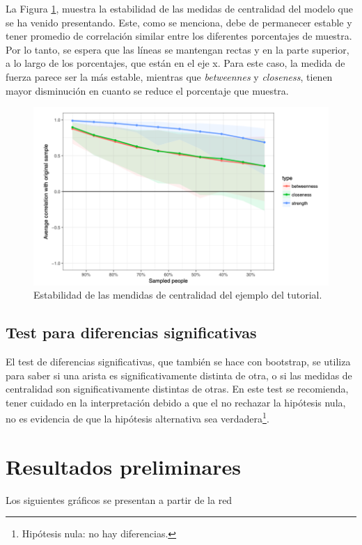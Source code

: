 \documentclass[11pt,spanish]{article}\usepackage[]{graphicx}\usepackage[]{color}
\begin{document}
La Figura \ref{fig:estabilidad_tutorial}, muestra la estabilidad de las medidas de centralidad del modelo que se ha venido presentando. Este, como se menciona, debe de permanecer estable y tener promedio de correlación similar entre los diferentes porcentajes de muestra. Por lo tanto, se espera que las líneas se mantengan rectas y en la parte superior, a lo largo de los porcentajes, que están en el eje x. Para este caso, la medida de fuerza parece ser la más estable, mientras que \emph{betweennes} y \emph{closeness}, tienen mayor disminución en cuanto se reduce el porcentaje que muestra. 

\begin{figure}[!ht]
\centering
\includegraphics[scale=0.5]{images/estabilidad_tutorial}
\caption{Estabilidad de las mendidas de centralidad del ejemplo del tutorial.}
\label{fig:estabilidad_tutorial}
\end{figure}

\subsection{Test para diferencias significativas}

El test de diferencias significativas, que también se hace con bootstrap, se utiliza para saber si una arista es significativamente distinta de otra, o si las medidas de centralidad son significativamente distintas de otras. En este test se recomienda, tener cuidado en la interpretación debido a que el no rechazar la hipótesis nula, no es evidencia de que la hipótesis alternativa sea verdadera\footnote{Hipótesis nula: no hay diferencias.}.


\section{Resultados preliminares}

Los siguientes gráficos se presentan a partir de la red




 



\newpage



\end{document}
